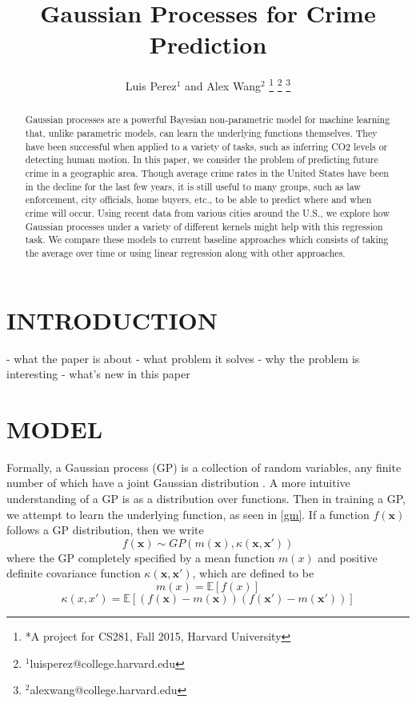 \documentclass[letterpaper, 12 pt, conference]{ieeeconf}  %
\title{\LARGE \bf
Gaussian Processes for Crime Prediction
}
\author{Luis Perez$^{1}$ and Alex Wang$^{2}$%
\thanks{*A project for CS281, Fall 2015, Harvard University}%
\thanks{$^{1}$luisperez@college.harvard.edu}%
\thanks{$^{2}$alexwang@college.harvard.edu}%
}
\newcommand{\bx}{\textbf{x}}
\begin{document}
\maketitle
\thispagestyle{empty}
\pagestyle{empty}


\begin{abstract}

Gaussian processes are a powerful Bayesian non-parametric model for machine learning that, unlike parametric models, can learn the underlying functions themselves. They have been successful when applied to a variety of tasks, such as inferring CO2 levels or detecting human motion. In this paper, we consider the problem of predicting future crime in a geographic area. Though average crime rates in the United States have been in the decline for the last few years, it is still useful to many groups, such as law enforcement, city officials, home buyers, etc., to be able to predict where and when crime will occur. Using recent data from various cities around the U.S., we explore how Gaussian processes under a variety of different kernels might help with this regression task. We compare these models to current baseline approaches which consists of taking the average over time or using linear regression along with other approaches.

\end{abstract}


\section{INTRODUCTION}

- what the paper is about
- what problem it solves
- why the problem is interesting
- what's new in this paper

\section{MODEL}

Formally, a Gaussian process (GP) is a collection of random variables, any finite number of which have a joint Gaussian distribution \cite{c1}. A more intuitive understanding of a GP is as a distribution over functions. Then in training a GP, we attempt to learn the underlying function, as seen in \ref{gm}. If a function $f(\bx)$ follows a GP distribution, then we write
$$f(\bx) \sim GP(m(\bx), \kappa(\bx, \bx'))$$
where the GP completely specified by a mean function $m(x)$ and positive definite covariance function $\kappa(\bx, \bx')$, which are defined to be
$$m(x) = \mathbb{E}[f(x)]$$
$$\kappa(x, x') = \mathbb{E}[(f(\bx) - m(\bx))(f(\bx') - m(\bx'))]$$
\end{document}
